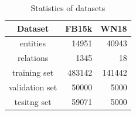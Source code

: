 \documentclass[twocolumn,a4paper,10pt,preprint,3p]{elsarticle}
\begin{document}

\begin{table}[hbtp]
    \centering
    \begin{tabular}{crr}
        \toprule
        Dataset & FB15k & WN18 \\
        \midrule
        entities &  14951   &  40943  \\
        relations &  1345   & 18 \\
        training set &  483142   & 141442 \\
        validation set &  50000   & 5000 \\
        tesitng set &  59071  & 5000 \\
        \bottomrule
    \end{tabular}
    \caption{Statistics of datasets}
\label{datasets}
\end{table}
\end{document}
